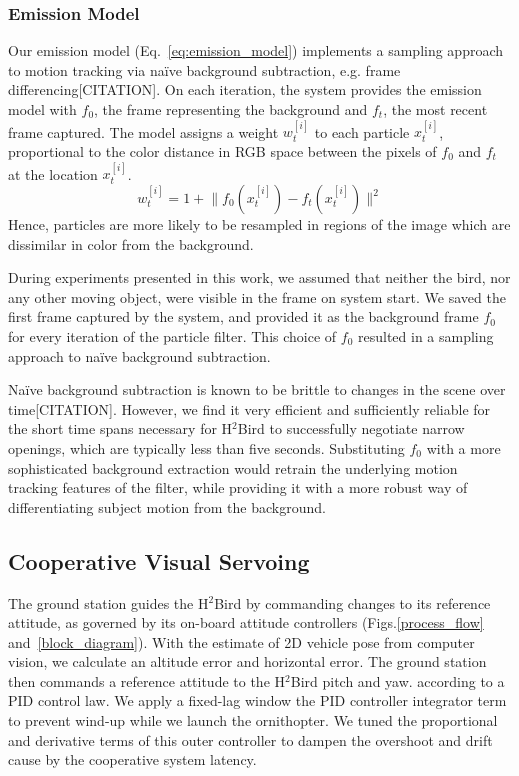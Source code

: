 \documentclass{aamas2013}
\providecommand{\norm}[1]{\lVert#1\rVert}
\begin{document}
\subsubsection{Emission Model}
Our emission model (Eq.~\ref{eq:emission_model}) implements a sampling
approach to motion tracking via na\"{i}ve background subtraction, e.g. frame differencing[CITATION].
On each iteration, the system provides the emission model with $f_0$, the frame representing 
the background and $f_t$, the most recent frame captured. The model assigns 
a weight $w^{[i]}_t$ to each particle $x^{[i]}_t$, proportional to the color 
distance in RGB space between the pixels of $f_0$ and $f_t$ at the location 
$x^{[i]}_t$.
\begin{equation}
\label{eq:emission_model}
w^{[i]}_t = 1 + \norm{f_0(x^{[i]}_t)-f_t(x^{[i]}_t)}^2
\end{equation} 
Hence, particles are more likely to be resampled in regions of 
the image which are dissimilar in color from the background.

During experiments presented in this work, we assumed that neither the bird, 
nor any other moving object, were visible in the frame on system 
start. We saved the first frame captured by the system, and provided it as 
the background frame $f_0$ for every iteration of the particle filter. This choice of $f_0$ 
resulted in a sampling approach to na\"{i}ve background subtraction. 

Na\"{i}ve background subtraction is known to be brittle to changes in the scene over 
time[CITATION]. However, we find it very efficient and sufficiently reliable for the 
short time spans necessary for H$^2$Bird to successfully negotiate narrow 
openings, which are typically less than five seconds. Substituting $f_0$ 
with a more sophisticated background extraction would retrain the underlying motion tracking features of the filter, while providing it with a more robust way of differentiating subject motion from the background.

\subsection{Cooperative Visual Servoing}
\label{sec:visual_servoing_concept}
The ground station guides the H$^2$Bird by commanding changes to its
reference attitude, as governed by its on-board attitude controllers (Figs.\ref{process_flow} and~\ref{block_diagram}). 
With the estimate of 2D vehicle pose from computer vision, we calculate an altitude
error and horizontal error. The ground station then commands a reference attitude to 
the H$^2$Bird pitch and yaw. according to a PID control law. We apply a fixed-lag window the PID controller integrator term 
to prevent wind-up while we launch the ornithopter. We tuned the proportional and derivative terms of this outer controller 
to dampen the overshoot and drift cause by the cooperative system latency.
\end{document}
